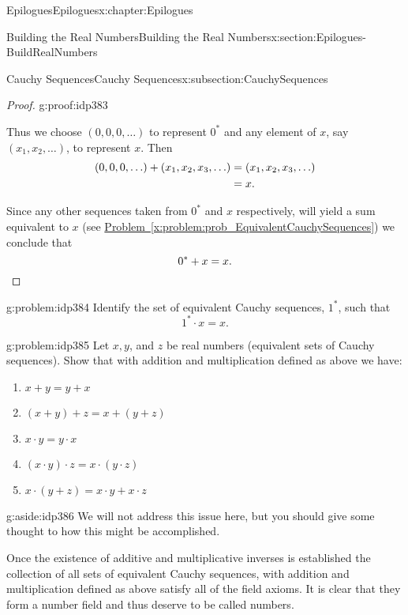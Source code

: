 \begin{chapterptx}{Epilogues}{}{Epilogues}{}{}{x:chapter:Epilogues}
\begin{sectionptx}{Building the Real Numbers}{}{Building the Real Numbers}{}{}{x:section:Epilogues-BuildRealNumbers}
\begin{subsectionptx}{Cauchy Sequences}{}{Cauchy Sequences}{}{}{x:subsection:CauchySequences}
\begin{proof}{}{g:proof:idp383}
				\par
				Thus we choose \((0, 0, 0, \ldots)\) to represent \(0^*\) and any element of \(x\), say \((x_1, x_2, \ldots)\), to represent \(x\). Then%
				\begin{align*}
					(0, 0, 0, \ldots) + (x_1, x_2, x_3, \ldots) \amp = (x_1, x_2, x_3, \ldots)\\
					\amp = x\text{.}
				\end{align*}
				\par
				Since any other sequences taken from \(0^*\) and \(x\) respectively, will yield a sum equivalent to \(x\) (see \hyperref[x:problem:prob_EquivalentCauchySequences]{Problem~{\xreffont\ref{x:problem:prob_EquivalentCauchySequences}}}) we conclude that%
				\begin{equation*}
					0^*+x=x\text{.}\qedhere
				\end{equation*}
			\end{proof}
			\begin{problem}{}{g:problem:idp384}%
				 Identify the set of equivalent Cauchy sequences, \(1^*\), such that%
				\begin{equation*}
					1^*\cdot x=x\text{.}
				\end{equation*}
			\end{problem}
			\begin{problem}{}{g:problem:idp385}%
				Let \(x, y\), and \(z\) be real numbers (equivalent sets of Cauchy sequences). Show that with addition and multiplication defined as above we have:%
				\begin{enumerate}[font=\bfseries,label=(\alph*),ref=\alph*]
					\item{}\(x+y=y+x\)%
					\item{}\((x+y)+z=x+(y+z)\)%
					\item{}\(x\cdot y=y\cdot x\)%
					\item{}\((x\cdot y)\cdot z=x\cdot (y\cdot z)\)%
					\item{}\(x\cdot(y+z)=x\cdot y+x\cdot z\)%
				\end{enumerate}
			\end{problem}
			\begin{aside}{}{g:aside:idp386}%
				We will not address this issue here, but you should give some thought to how this might be accomplished.%
			\end{aside}
			Once the existence of additive and multiplicative inverses is established the collection of all sets of equivalent Cauchy sequences, with addition and multiplication defined as above satisfy all of the field axioms.  It is clear that they form a number field and thus deserve to be called numbers.%

\end{subsectionptx}
\end{sectionptx}
\end{chapterptx}
